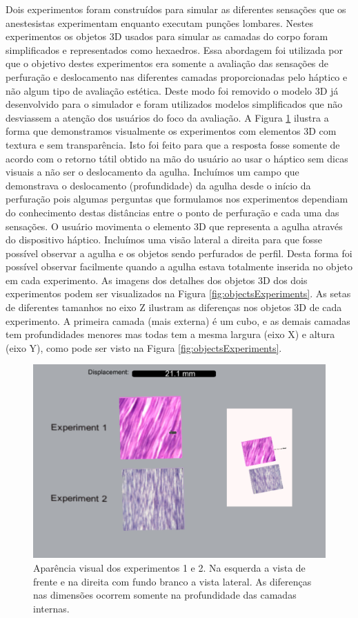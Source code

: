 Dois experimentos foram construídos para simular as diferentes sensações que os anestesistas experimentam enquanto executam punções lombares. Nestes experimentos os objetos 3D usados para simular as camadas do corpo foram simplificados e representados como hexaedros. Essa abordagem foi utilizada por que o objetivo destes experimentos era somente a avaliação das sensações de perfuração e deslocamento nas diferentes camadas proporcionadas pelo háptico e não algum tipo de avaliação estética. Deste modo foi removido o modelo 3D já desenvolvido para o simulador e foram utilizados modelos simplificados que não desviassem a atenção dos usuários do foco da avaliação. 
A Figura \ref{fig:visualExperimentos1e2} ilustra a forma que demonstramos visualmente os experimentos com elementos 3D com textura e sem transparência. Isto foi feito para que a resposta fosse somente de acordo com o retorno tátil obtido na mão do usuário ao usar o háptico sem dicas visuais a não ser o deslocamento da agulha. Incluímos um campo que demonstrava o deslocamento (profundidade) da agulha desde o início da perfuração pois algumas perguntas que formulamos nos experimentos dependiam do conhecimento destas distâncias entre o ponto de perfuração e cada uma das sensações. O usuário movimenta o elemento 3D que representa a agulha através do dispositivo háptico. Incluímos uma visão lateral a direita para que fosse possível observar a agulha e os objetos sendo perfurados de perfil. Desta forma foi possível observar facilmente quando a agulha estava totalmente inserida no objeto em cada experimento.
As imagens dos detalhes dos objetos 3D dos dois experimentos podem ser visualizados na Figura \ref{fig:objectsExperiments}. As setas de diferentes tamanhos no eixo Z ilustram as diferenças nos objetos 3D de cada experimento. A primeira camada (mais externa) é um cubo, e as demais camadas tem profundidades menores mas todas tem a mesma largura (eixo X) e altura (eixo Y), como pode ser visto na Figura \ref{fig:objectsExperiments}.

\begin{figure}[ht!]
    \centering
    \includegraphics[width=0.8\linewidth]{capitulos/figuras/visual-experimentos.png} 
    \caption{Aparência visual dos experimentos 1 e 2. Na esquerda a vista de frente e na direita com fundo branco a vista lateral. As diferenças nas dimensões ocorrem somente na profundidade das camadas internas.}
    \label{fig:visualExperimentos1e2}
\end{figure}

